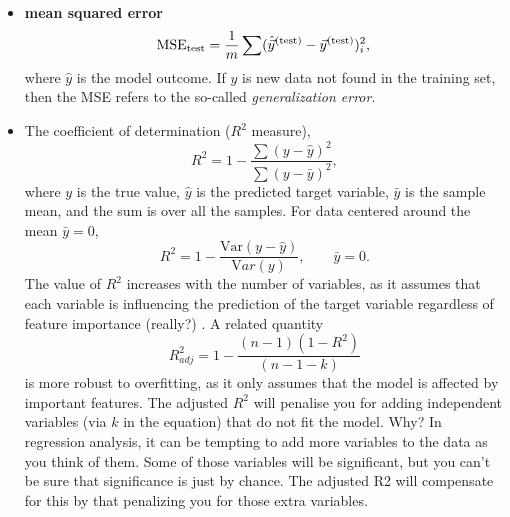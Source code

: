 \documentclass[11pt, oneside]{article}   	%
\begin{document}
\begin{itemize}
%
\item \textbf{mean squared error} 
\begin{equation}
\mathrm{MSE}_{\rm test} = \frac{1}{m} \sum (\hat{\vec y}{}^{(\rm test)} - \vec{y}{}^{(\rm test)})_{i}^{2},\\
\end{equation}
%
where $\hat y$ is the model outcome. If $y$ is new data not found in the training set, then the MSE refers 
to the so-called \emph{generalization error}.
\item  The coefficient of determination ($R^{2}$ measure),
\begin{equation}
R^{2}= 1 - \frac{\sum(y-\hat y)^{2}}{\sum(y-\bar y)^{2}},
\end{equation}
where $y$ is the true value, $\hat y$ is the predicted target variable, $\bar y$ is the sample mean, and the sum is
over all the samples. For data centered around the mean $\bar y = 0$, 
\begin{equation}
R^{2} = 1 - \frac{\mathrm{Var}(y-\hat y)}{\mathrm Var(y)}, \qquad \bar y =0.
\end{equation}
The value of $R^{2}$ increases with the number of variables, as it assumes that each variable is influencing the prediction 
of the target variable regardless of feature importance (really?) .
A related quantity 
\[ R^{2}_{adj} = 1-\frac{(n-1)(1-R^{2})}{(n-1-k)}\] is more robust to overfitting, as it only assumes that the model is affected by important features. The adjusted $R^{2}$ will penalise you for adding independent variables (via $k$ in the equation) that do not fit the model. Why? In regression analysis, it can be tempting to add more variables to the data as you think of them. Some of those variables will be significant, but you can’t be sure that significance is just by chance. The adjusted R2 will compensate for this by that penalizing you for those extra variables.


\end{itemize}
\end{document}
